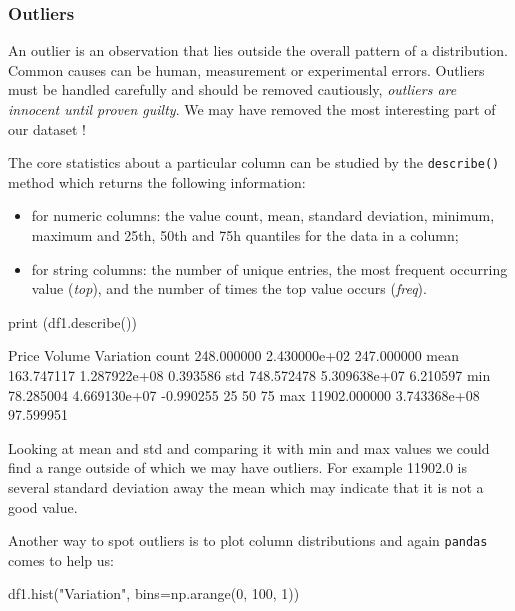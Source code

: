 \subsubsection{Outliers}\label{outliers}

An outlier is an observation that lies outside the overall pattern of a distribution. Common causes can be human, measurement or experimental errors. Outliers must be handled carefully and should be removed cautiously, \emph{outliers are innocent until proven guilty}. We may have removed the most interesting part of our dataset !

The core statistics about a particular column can be studied by the \texttt{describe()} method which returns the following information:
\begin{itemize}
	\tightlist
\item for numeric columns: the value count, mean, standard deviation, minimum, maximum and 25th, 50th and 75h quantiles for the data in a column;
\item for string columns: the number of unique entries, the most frequent occurring value (\emph{top}), and the number of times the top value occurs (\emph{freq}).
\end{itemize}

\begin{ipython}
print (df1.describe())
\end{ipython}
\begin{ioutput}
              Price        Volume   Variation
count    248.000000  2.430000e+02  247.000000
mean     163.747117  1.287922e+08    0.393586
std      748.572478  5.309638e+07    6.210597
min       78.285004  4.669130e+07   -0.990255
25%
50%
75%
max    11902.000000  3.743368e+08   97.599951
\end{ioutput}
        
Looking at mean and std and comparing it with min and max values we could find a range outside of which we may have outliers. For example 11902.0 is several standard deviation away the mean which may indicate that it is not a good value.

Another way to spot outliers is to plot column distributions and again \texttt{pandas} comes to help us:
\begin{ipython}
df1.hist("Variation", bins=np.arange(0, 100, 1))
\end{ipython}

